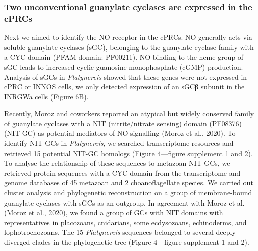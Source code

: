 \documentclass[
  11pt,
  letterpaper,
  DIV=11,
  numbers=noendperiod]{scrartcl}
\begin{document}
\subsubsection{Two unconventional guanylate cyclases are expressed in
the
cPRCs}\label{two-unconventional-guanylate-cyclases-are-expressed-in-the-cprcs}

Next we aimed to identify the NO receptor in the cPRCs. NO generally
acts via soluble guanylate cyclases (sGC), belonging to the guanylate
cyclase family with a CYC domain (PFAM domain: PF00211). NO binding to
the heme group of sGC leads to increased cyclic guanosine monophosphate
(cGMP) production. Analysis of sGCs in \emph{Platynereis} showed that
these genes were not expressed in cPRC or INNOS cells, we only detected
expression of an sGCβ subunit in the INRGWa cells (Figure 6B).

Recently, Moroz and coworkers reported an atypical but widely conserved
family of guanylate cyclases with a NIT (nitrite/nitrate sensing) domain
(PF08376) (NIT-GC) as potential mediators of NO signalling (Moroz et
al., 2020). To identify NIT-GCs in \emph{Platynereis}, we searched
transcriptome resources and retrieved 15 potential NIT-GC homologs
(Figure 4---figure supplement 1 and 2). To analyse the relationship of
these sequences to metazoan NIT-GCs, we retrieved protein sequences with
a CYC domain from the transcriptome and genome databases of 45 metazoan
and 2 choanoflagellate species. We carried out cluster analysis and
phylogenetic reconstruction on a group of membrane-bound guanylate
cyclases with sGCs as an outgroup. In agreement with Moroz et al. (Moroz
et al., 2020), we found a group of GCs with NIT domains with
representatives in placozoans, cnidarians, some ecdysozoans,
echinoderms, and lophotrochozoans. The 15 \emph{Platynereis} sequences
belonged to several deeply diverged clades in the phylogenetic tree
(Figure 4---figure supplement 1 and 2).
\end{document}
